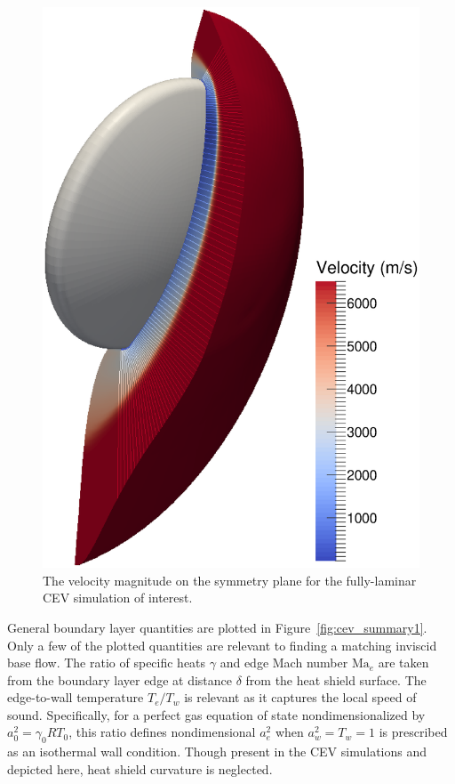 \documentclass[letterpaper,11pt,nointlimits,reqno]{amsart}
\newcommand{\Mach}[1][]{\mbox{Ma}_{#1}}
\begin{document}
\begin{figure}
  \centering
  \includegraphics[height=0.55\textheight]{symplanenorm}
  \caption{
    \label{fig:cev_symplane}
    The velocity magnitude on the symmetry plane for the fully-laminar
    CEV simulation of interest.
  }
\end{figure}

General boundary layer quantities are plotted in Figure~\ref{fig:cev_summary1}.
Only a few of the plotted quantities are relevant to finding a matching
inviscid base flow.  The ratio of specific heats $\gamma$ and edge Mach number
$\Mach[e]{}$ are taken from the boundary layer edge at distance $\delta$ from
the heat shield surface.  The edge-to-wall temperature $T_e/T_w$ is relevant as
it captures the local speed of sound.  Specifically, for a perfect gas equation
of state nondimensionalized by $a_0^2=\gamma_{0}RT_0$, this ratio defines
nondimensional $a_e^2$ when $a_w^2=T_w=1$ is prescribed as an isothermal wall
condition.  Though present in the CEV simulations and depicted here, heat
shield curvature is neglected.
\end{document}
